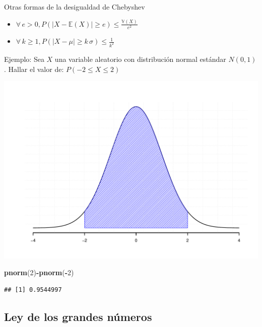 \documentclass[
  ignorenonframetext,
]{beamer}
\newenvironment{Shaded}{\begin{snugshade}}{\end{snugshade}}
\newcommand{\DecValTok}[1]{\textcolor[rgb]{0.00,0.00,0.81}{#1}}
\newcommand{\KeywordTok}[1]{\textcolor[rgb]{0.13,0.29,0.53}{\textbf{#1}}}
\newcommand{\NormalTok}[1]{#1}
\newcommand{\OperatorTok}[1]{\textcolor[rgb]{0.81,0.36,0.00}{\textbf{#1}}}
\begin{document}
\begin{frame}[fragile]{Otras formas de la desigualdad de Chebyshev}

\begin{itemize}

\item $\forall \, e>0,\displaystyle  P(|X-\mathbb{E}(X) |\geq e)\leq \frac{\mathbb{V}(X) }{e^2}$
\item $\forall \, k\geq 1,\displaystyle  P(|X-\mu|\geq k\,\sigma)\leq \frac{1}{k^2}$
\end{itemize}

Ejemplo: Sea \(X\) una variable aleatorio con distribución normal
estándar \(N(0,1)\). Hallar el valor de: \(P(-2\leq X \leq 2)\)

\begin{center}\includegraphics[width=0.4\linewidth]{clase2Inferencia_files/figure-beamer/unnamed-chunk-7-1} \end{center}

\begin{Shaded}
\begin{Highlighting}[]
\KeywordTok{pnorm}\NormalTok{(}\DecValTok{2}\NormalTok{)}\OperatorTok{-}\KeywordTok{pnorm}\NormalTok{(}\OperatorTok{-}\DecValTok{2}\NormalTok{)}
\end{Highlighting}
\end{Shaded}

\begin{verbatim}
## [1] 0.9544997
\end{verbatim}

\end{frame}

\hypertarget{ley-de-los-grandes-nuxfameros}{%
\subsection{Ley de los grandes
números}\label{ley-de-los-grandes-nuxfameros}}
\end{document}
